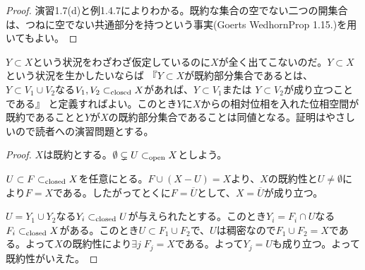 ﻿
\begin{proof}
  演習1.7(d)と例1.4.7によりわかる。既約な集合の空でない二つの開集合は、つねに空でない共通部分を持つという事実(Goerts Wedhorn\cite{GW}Prop 1.15.)を用いてもよい。
\end{proof}


\begin{rem}
  $Y \subset X$という状況をわざわざ仮定しているのに$X$が全く出てこないのだ。$Y \subset X$という状況を生かしたいならば
『$Y \subset X$が既約部分集合であるとは、$Y \subset V_1 \cup V_2$なる$V_1, V_2 \subset_{\text{closed}} X$があれば、$Y \subset V_1$または
$Y \subset V_2$が成り立つことである』
と定義すればよい。このとき$Y$に$X$からの相対位相を入れた位相空間が既約であることと$Y$が$X$の既約部分集合であることは同値となる。証明はやさしいので読者への演習問題とする。
\end{rem}


\begin{proof}
  $X$は既約とする。$\emptyset \subsetneq U \subset_{\text{open}} X$としよう。

 $U \subset F \subset_{\text{closed}} X$を任意にとる。$F \cup (X - U)=X$より、$X$の既約性と$U \neq \emptyset$により$F =X$である。したがってとくに$F = \overline{U}$として、$X = \overline{U}$が成り立つ。

$U = Y_1 \cup Y_2$なる$Y_i \subset_{\text{closed}} U$が与えられたとする。このとき$Y_i = F_i \cap U$なる$F_i \subset_{\text{closed}} X$がある。このとき$U \subset F_1 \cup F_2$で、$U$は稠密なので$F_1 \cup F_2 = X$である。よって$X$の既約性により$\exists j \; F_j =X$である。よって$Y_j = U$も成り立つ。よって既約性がいえた。
\end{proof}

\begin{comment}
\bfsubsection{命題1.2}
\barquo{
任意のイデアル$\fraka \subset A$について$I(Z(\fraka)) = \sqrt{\fraka}$, すなわち$\fraka$の根基である。
}
\begin{rem}
これは次のZariskiの補題からも示すことができる。
\begin{claim}
  $k$は体、$B$は$k$上の代数として有限生成で、$B$が体だとすると、$B/k$は有限次拡大。
\end{claim}
\end{rem}
\end{comment}

